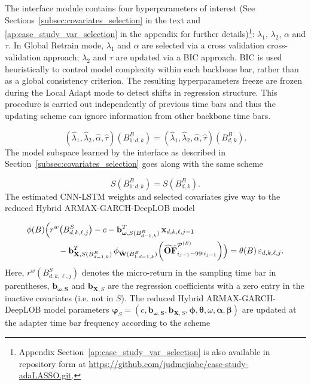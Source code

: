 \documentclass[10pt,a4paper,oneside]{article}
\providecommand{\DIFaddtex}[1]{{\protect\color{blue} \sf #1}} %
\providecommand{\DIFdeltex}[1]{{\protect\color{red} \scriptsize #1}} %
\providecommand{\DIFaddbegin}{} %
\providecommand{\DIFaddend}{} %
\providecommand{\DIFdelbegin}{} %
\providecommand{\DIFdelend}{} %
\providecommand{\DIFadd}[1]{\texorpdfstring{\DIFaddtex{#1}}{#1}} %
\providecommand{\DIFdel}[1]{\texorpdfstring{\DIFdeltex{#1}}{}} %
\newcommand{\DIFscaledelfig}{0.5}
\newlength{\DIFdelgraphicswidth} %
\newlength{\DIFdelgraphicsheight} %
\newcommand{\DIFaddincludegraphics}[2][]{{\color{blue}\fbox{\DIFOincludegraphics[#1]{#2}}}} %
\newcommand{\DIFdelincludegraphics}[2][]{%
\sbox{\DIFdelgraphicsbox}{\DIFOincludegraphics[#1]{#2}}%
\settoboxwidth{\DIFdelgraphicswidth}{\DIFdelgraphicsbox} %
\settoboxtotalheight{\DIFdelgraphicsheight}{\DIFdelgraphicsbox} %
\scalebox{\DIFscaledelfig}{%
\parbox[b]{\DIFdelgraphicswidth}{\usebox{\DIFdelgraphicsbox}\\[-\baselineskip] \rule{\DIFdelgraphicswidth}{0em}}\llap{\resizebox{\DIFdelgraphicswidth}{\DIFdelgraphicsheight}{%
\setlength{\unitlength}{\DIFdelgraphicswidth}%
\begin{picture}(1,1)%
\thicklines\linethickness{2pt} %
{\color[rgb]{1,0,0}\put(0,0){\framebox(1,1){}}}%
{\color[rgb]{1,0,0}\put(0,0){\line( 1,1){1}}}%
{\color[rgb]{1,0,0}\put(0,1){\line(1,-1){1}}}%
\end{picture}%
}\hspace*{3pt}}} %
} %
\DeclareRobustCommand{\DIFaddbegin}{\DIFOaddbegin \let\includegraphics\DIFaddincludegraphics} %
\DeclareRobustCommand{\DIFaddend}{\DIFOaddend \let\includegraphics\DIFOincludegraphics} %
\DeclareRobustCommand{\DIFdelbegin}{\DIFOdelbegin \let\includegraphics\DIFdelincludegraphics} %
\DeclareRobustCommand{\DIFdelend}{\DIFOaddend \let\includegraphics\DIFOincludegraphics} %
\begin{document}
The interface module contains four hyperparameters of interest (See Sections~\ref{subsec:covariates_selection} in the text and \ref{ap:case_study_var_selection} in the appendix for further details)\footnote{Appendix Section~\ref{ap:case_study_var_selection} is also available in repository form at \url{https://github.com/judmejiabe/case-study-adaLASSO.git}.}: $\lambda_1$, $\lambda_2$, $\alpha$ and $\tau$. In Global Retrain mode, \(\lambda_1\) and \(\alpha\) are selected via a \DIFdelbegin \DIFdel{cross validation }\DIFdelend \DIFaddbegin \DIFadd{cross-validation }\DIFaddend approach; \(\lambda_2\) and \(\tau\) are updated via a BIC approach. BIC is used heuristically to control model complexity within each backbone bar, rather than as a global consistency criterion. The resulting hyperparameters \DIFdelbegin \DIFdel{freeze }\DIFdelend \DIFaddbegin \DIFadd{are frozen }\DIFaddend during the Local Adapt mode to detect shifts in regression structure. This procedure is carried out independently of previous time bars and thus the updating scheme can ignore information from other backbone time bars.

$$
(\hat{\lambda}_1, \hat{\lambda}_2, \hat{\alpha}, \hat{\tau})(B^{B}_{1:d, k}) = (\hat{\lambda}_1, \hat{\lambda}_2, \hat{\alpha}, \hat{\tau})(B^{B}_{d, k}).
$$
The model subspace learned by the interface as described in Section~\ref{subsec:covariates_selection} goes along with the same scheme

$$
S(B^B_{1:d, k}) = S(B^B_{d, k}).
$$
The estimated CNN-LSTM weights and selected covariates give way to the reduced Hybrid ARMAX-GARCH-DeepLOB model

\begin{align*}
\phi(B)\Bigl(&r^w\bigl(B^{S}_{d,k,\ell,j}\bigr) - c 
    - \mathbf{b}_{\boldsymbol{\omega}, S(B^B_{d-1,k})}^{T}\,\mathbf{x}_{d,k,\ell,j-1} \notag\\
    &\quad - \mathbf{b}^T_{\mathbf{X}, S(B^B_{d-1,k})}\,
      \phi_{\hat{\mathbf{W}}(B^B_{1:d-1,k})}\!\left(\widetilde{\mathbf{OF}}^{\mathcal{P}^{(E)}}_{i_{j-1}-99:i_{j-1}}\right)
\Bigr) = \theta(B)\,\varepsilon_{d,k,\ell,j}.
\end{align*}
Here, $r^w(B^{S}_{d,k,\ell,j})$ denotes the micro-return in the sampling time bar in parentheses, $\mathbf{b}_{\boldsymbol{\omega, S}}$ and $\mathbf{b}_{\mathbf{X}, S}$ are the regression coefficients with a zero entry in the inactive covariates (i.e. not in $S$). The reduced Hybrid ARMAX-GARCH-DeepLOB model parameters $\boldsymbol{\varphi}_{S} = (c, \mathbf{b}_{\boldsymbol{\omega, S}}, \mathbf{b}_{\mathbf{X}, S}, \boldsymbol{\phi}, \boldsymbol{\theta}, \omega, \boldsymbol{\alpha}, \boldsymbol{\beta})$ are updated at the adapter time bar frequency according to the scheme
\end{document}
